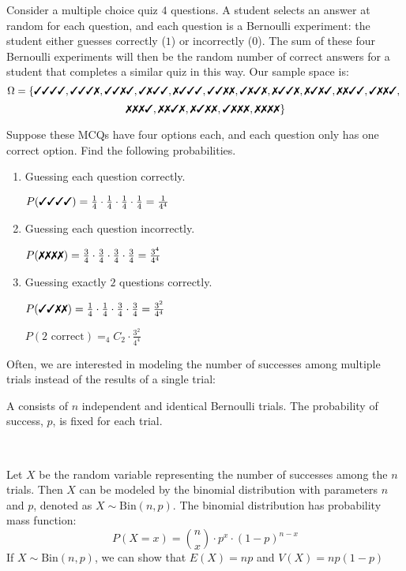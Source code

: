 \begin{example}
    Consider a multiple choice quiz $4$ questions. A student selects an answer at random for each question, and each question is a Bernoulli experiment: the student either guesses correctly ($1$) or incorrectly ($0$). The sum of these four Bernoulli experiments will then be the random number of correct answers for a student that completes a similar quiz in this way. Our sample space is: 
    $$\Omega = \left\{ \cmark \cmark \cmark \cmark, \cmark \cmark \cmark \xmark, \cmark \cmark \xmark \cmark, \cmark \xmark \cmark \cmark, \xmark \cmark \cmark \cmark, \cmark \cmark \xmark \xmark, \cmark \xmark \cmark \xmark, \xmark \cmark \cmark \xmark, \xmark \cmark \xmark \cmark, \xmark \xmark \cmark \cmark, \cmark \xmark \xmark \cmark, \right.$$
    $$\left. \xmark \xmark \xmark \cmark, \xmark \xmark \cmark \xmark, \xmark \cmark \xmark \xmark, \cmark \xmark \xmark \xmark, \xmark \xmark \xmark \xmark \right\}$$

    Suppose these MCQs have four options each, and each question only has one correct option. Find the following probabilities. 

    \begin{enumerate}[label=\alph*)]
        \item Guessing each question correctly. 

        $P(\cmark \cmark \cmark \cmark) = \frac{1}{4} \cdot \frac{1}{4} \cdot \frac{1}{4} \cdot \frac{1}{4} = \frac{1}{4^4}$

        \item Guessing each question incorrectly. 

        $P(\xmark \xmark \xmark \xmark) = \frac{3}{4} \cdot \frac{3}{4} \cdot \frac{3}{4} \cdot \frac{3}{4} = \frac{3^4}{4^4}$
        \item Guessing exactly $2$ questions correctly. 

        $P(\cmark \cmark \xmark \xmark) = \frac{1}{4} \cdot \frac{1}{4} \cdot \frac{3}{4} \cdot \frac{3}{4} = \frac{3^2}{4^4}$

        $P(2 \text{ correct}) = _4C_2 \cdot \frac{3^2}{4^4}$
    \end{enumerate}
\end{example}

Often, we are interested in modeling the number of successes among multiple trials instead of the results of a single trial:

\begin{definition}
    A  consists of $n$ independent and identical Bernoulli trials. The probability of success, $p$, is fixed for each trial. 

    {~~~}

    Let $X$ be the random variable representing the number of successes among the $n$ trials. Then $X$ can be modeled by the binomial distribution with parameters $n$ and $p$, denoted as $X \sim \mathrm{Bin}(n, p)$. The binomial distribution has probability mass function: $$P(X = x) = \binom{n}{x} \cdot p^x \cdot (1 - p)^{n - x}$$ If $X \sim \mathrm{Bin}(n, p)$, we can show that $E(X) = np$ and $V(X) = np(1 - p)$
\end{definition}

